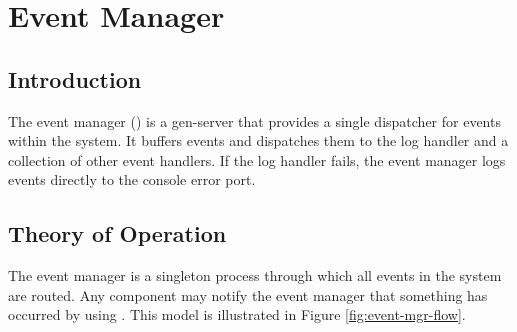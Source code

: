 %
%
%

\chapter {Event Manager}\label{chap:event-mgr}

\section {Introduction}

The event manager () is a gen-server that provides a
single dispatcher for events within the system. It buffers events and
dispatches them to the log handler and a collection of other event
handlers. If the log handler fails, the event manager logs events
directly to the console error port.

\section {Theory of Operation}

The event manager is a singleton process through which all events in
the system are routed. Any component may notify the event manager that
something has occurred by using . This model
is illustrated in Figure \ref{fig:event-mgr-flow}.

